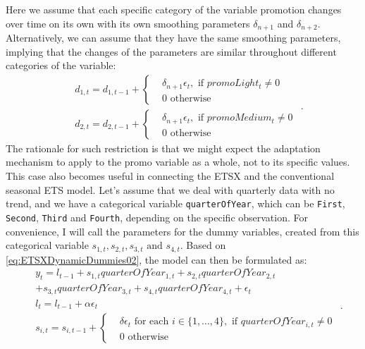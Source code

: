 \documentclass[
]{book}
\theoremstyle{definition}
\theoremstyle{definition}
\theoremstyle{definition}
\theoremstyle{definition}
\theoremstyle{remark}
\begin{document}
Here we assume that each specific category of the variable promotion changes over time on its own with its own smoothing parameters \(\delta_{n+1}\) and \(\delta_{n+2}\). Alternatively, we can assume that they have the same smoothing parameters, implying that the changes of the parameters are similar throughout different categories of the variable:
\begin{equation}
  \begin{aligned}
    & d_{1,t} = d_{1,t-1} + \left \lbrace \begin{aligned}
                  &\delta_{n+1} \epsilon_t, \text{ if } promoLight_t\neq 0 \\
                  &0 \text{ otherwise }
            \end{aligned} \right. \\
    & d_{2,t} = d_{2,t-1} + \left \lbrace \begin{aligned}
                  &\delta_{n+1} \epsilon_t, \text{ if } promoMedium_t\neq 0 \\
                  &0 \text{ otherwise }
            \end{aligned} \right.
  \end{aligned} .
  \label{eq:ETSXDynamicDummies02}
\end{equation}
The rationale for such restriction is that we might expect the adaptation mechanism to apply to the promo variable as a whole, not to its specific values. This case also becomes useful in connecting the ETSX and the conventional seasonal ETS model. Let's assume that we deal with quarterly data with no trend, and we have a categorical variable \texttt{quarterOfYear}, which can be \texttt{First}, \texttt{Second}, \texttt{Third} and \texttt{Fourth}, depending on the specific observation. For convenience, I will call the parameters for the dummy variables, created from this categorical variable \(s_{1,t}, s_{2,t}, s_{3,t} \text{ and } s_{4,t}\). Based on \eqref{eq:ETSXDynamicDummies02}, the model can then be formulated as:
\begin{equation}
  \begin{aligned}
    & y_{t} = l_{t-1} + s_{1,t} quarterOfYear_{1,t} + s_{2,t} quarterOfYear_{2,t} \\
            & + s_{3,t} quarterOfYear_{3,t} + s_{4,t} quarterOfYear_{4,t} + \epsilon_t \\
    & l_t = l_{t-1} + \alpha \epsilon_t \\
    & s_{i,t} = s_{i,t-1} + \left \lbrace \begin{aligned}
                  &\delta \epsilon_t \text{ for each } i \in \{1, \dots, 4\}, \text{ if } quarterOfYear_{i,t}\neq 0 \\
                  &0 \text{ otherwise }
            \end{aligned} \right.
  \end{aligned} .
  \label{eq:ETSXDynamicDummiesSeasonal}
\end{equation}
\end{document}
